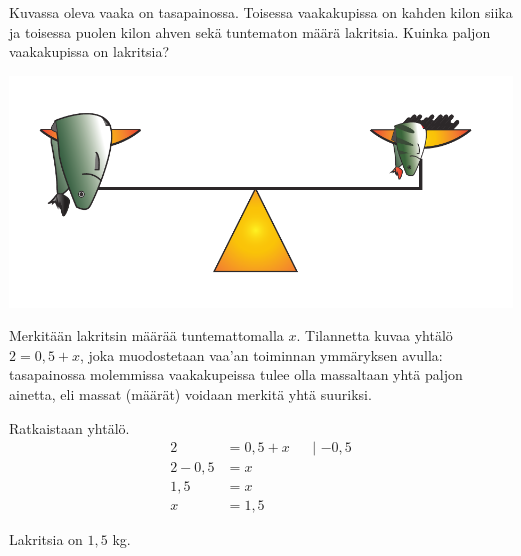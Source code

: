 \begin{esimerkki}
Kuvassa oleva vaaka on tasapainossa. Toisessa vaakakupissa on kahden kilon siika ja toisessa puolen kilon ahven sekä tuntematon määrä lakritsia.	Kuinka paljon vaakakupissa on lakritsia?
	\begin{center}
		\includegraphics[scale=0.6]{pictures/Kuva10-1-vaaka.pdf} %
	\end{center}
	\begin{esimratk}
Merkitään lakritsin määrää tuntemattomalla $x$. Tilannetta kuvaa yhtälö $2 = 0,5 + x$, joka muodostetaan vaa'an toiminnan ymmäryksen avulla: tasapainossa molemmissa vaakakupeissa tulee olla massaltaan yhtä paljon ainetta, eli massat (määrät) voidaan merkitä yhtä suuriksi.

Ratkaistaan yhtälö.
		\begin{align*}
			2 &= 0,5 + x &&\text{| $-0,5$} \\
			2 - 0,5 &= x && \\
			1,5 &= x && \\
			x &= 1,5 &&
		\end{align*}
	\end{esimratk}
	\begin{esimvast}
		Lakritsia on $1,5$ kg.
	\end{esimvast}
\end{esimerkki}

